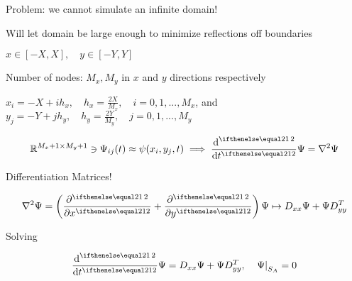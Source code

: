 Problem: we cannot simulate an infinite domain!

Will let domain be large enough to minimize reflections off boundaries

$x \in \left[-X,X\right], \quad y \in \left[-Y,Y\right]$

Number of nodes: $M_x, M_y$ in $x$ and $y$ directions respectively

$x_i = -X + ih_x, \quad h_x = \frac{2X}{M_x}, \quad i = 0, 1, ..., M_x$, 
and $y_j = -Y + jh_y, \quad h_y = \frac{2Y}{M_y}, \quad j = 0, 1, ..., M_y$

$$\R^{M_x+1\times M_y+1} \ni \Psi_{ij}(t) \approx \psi(x_i, y_j, t) \implies \der[2]{}{t} \Psi = \nabla^2 \Psi$$

Differentiation Matrices!

$$\nabla^2 \Psi = \left(\pder[2]{}{x} + \pder[2]{}{y}\right) \Psi \mapsto D_{xx} \Psi + \Psi D^T_{yy}$$

Solving 

$$\der[2]{}{t} \Psi = D_{xx} \Psi + \Psi D^T_{yy}, \quad \left.\Psi\right|_{S_A} = 0$$
